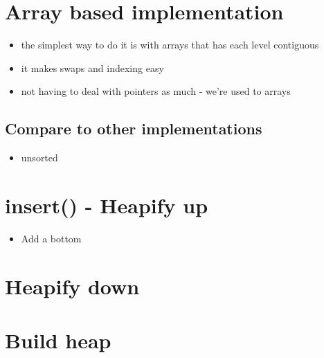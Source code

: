 \documentclass[
]{book}
\providecommand{\tightlist}{%
  \setlength{\itemsep}{0pt}\setlength{\parskip}{0pt}}
\begin{document}
\hypertarget{array-based-implementation}{%
\section{Array based implementation}\label{array-based-implementation}}

\begin{itemize}
\item
  the simplest way to do it is with arrays that has each level contiguous
\item
  it makes swaps and indexing easy
\item
  not having to deal with pointers as much - we're used to arrays
\end{itemize}

\hypertarget{compare-to-other-implementations}{%
\subsection{Compare to other implementations}\label{compare-to-other-implementations}}

\begin{itemize}
\tightlist
\item
  unsorted
\end{itemize}

\hypertarget{insert---heapify-up}{%
\section{insert() - Heapify up}\label{insert---heapify-up}}

\begin{itemize}
\tightlist
\item
  Add a bottom
\end{itemize}

\hypertarget{heapify-down}{%
\section{Heapify down}\label{heapify-down}}

\hypertarget{build-heap}{%
\section{Build heap}\label{build-heap}}
\end{document}
